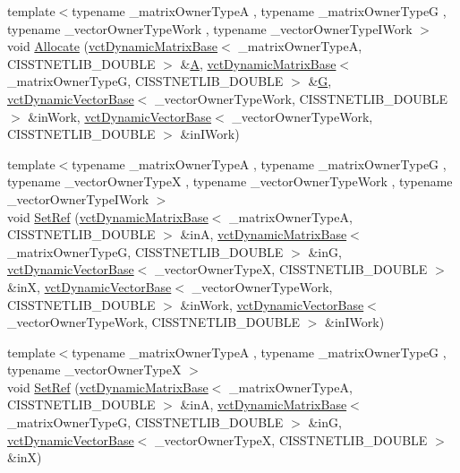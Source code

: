 \begin{DoxyCompactItemize}
{\footnotesize template$<$typename \-\_\-matrix\-Owner\-Type\-A , typename \-\_\-matrix\-Owner\-Type\-G , typename \-\_\-vector\-Owner\-Type\-Work , typename \-\_\-vector\-Owner\-Type\-I\-Work $>$ }\\void \hyperlink{classnmr_l_sq_lin_solution_dynamic_a292665b5ef73075f7679ebc890e7b09d}{Allocate} (\hyperlink{classvct_dynamic_matrix_base}{vct\-Dynamic\-Matrix\-Base}$<$ \-\_\-matrix\-Owner\-Type\-A, C\-I\-S\-S\-T\-N\-E\-T\-L\-I\-B\-\_\-\-D\-O\-U\-B\-L\-E $>$ \&\hyperlink{classnmr_l_sq_lin_solution_dynamic_aa4a41abac141e2e55dd5cafb59169dfd}{A}, \hyperlink{classvct_dynamic_matrix_base}{vct\-Dynamic\-Matrix\-Base}$<$ \-\_\-matrix\-Owner\-Type\-G, C\-I\-S\-S\-T\-N\-E\-T\-L\-I\-B\-\_\-\-D\-O\-U\-B\-L\-E $>$ \&\hyperlink{classnmr_l_sq_lin_solution_dynamic_a399cb314fb848d36f58c14830bad0c28}{G}, \hyperlink{classvct_dynamic_vector_base}{vct\-Dynamic\-Vector\-Base}$<$ \-\_\-vector\-Owner\-Type\-Work, C\-I\-S\-S\-T\-N\-E\-T\-L\-I\-B\-\_\-\-D\-O\-U\-B\-L\-E $>$ \&in\-Work, \hyperlink{classvct_dynamic_vector_base}{vct\-Dynamic\-Vector\-Base}$<$ \-\_\-vector\-Owner\-Type\-Work, C\-I\-S\-S\-T\-N\-E\-T\-L\-I\-B\-\_\-\-D\-O\-U\-B\-L\-E $>$ \&in\-I\-Work)
\item 
{\footnotesize template$<$typename \-\_\-matrix\-Owner\-Type\-A , typename \-\_\-matrix\-Owner\-Type\-G , typename \-\_\-vector\-Owner\-Type\-X , typename \-\_\-vector\-Owner\-Type\-Work , typename \-\_\-vector\-Owner\-Type\-I\-Work $>$ }\\void \hyperlink{classnmr_l_sq_lin_solution_dynamic_aa5a0eaab043339d1aa2fdaebbffd8cfa}{Set\-Ref} (\hyperlink{classvct_dynamic_matrix_base}{vct\-Dynamic\-Matrix\-Base}$<$ \-\_\-matrix\-Owner\-Type\-A, C\-I\-S\-S\-T\-N\-E\-T\-L\-I\-B\-\_\-\-D\-O\-U\-B\-L\-E $>$ \&in\-A, \hyperlink{classvct_dynamic_matrix_base}{vct\-Dynamic\-Matrix\-Base}$<$ \-\_\-matrix\-Owner\-Type\-G, C\-I\-S\-S\-T\-N\-E\-T\-L\-I\-B\-\_\-\-D\-O\-U\-B\-L\-E $>$ \&in\-G, \hyperlink{classvct_dynamic_vector_base}{vct\-Dynamic\-Vector\-Base}$<$ \-\_\-vector\-Owner\-Type\-X, C\-I\-S\-S\-T\-N\-E\-T\-L\-I\-B\-\_\-\-D\-O\-U\-B\-L\-E $>$ \&in\-X, \hyperlink{classvct_dynamic_vector_base}{vct\-Dynamic\-Vector\-Base}$<$ \-\_\-vector\-Owner\-Type\-Work, C\-I\-S\-S\-T\-N\-E\-T\-L\-I\-B\-\_\-\-D\-O\-U\-B\-L\-E $>$ \&in\-Work, \hyperlink{classvct_dynamic_vector_base}{vct\-Dynamic\-Vector\-Base}$<$ \-\_\-vector\-Owner\-Type\-Work, C\-I\-S\-S\-T\-N\-E\-T\-L\-I\-B\-\_\-\-D\-O\-U\-B\-L\-E $>$ \&in\-I\-Work)
\item 
{\footnotesize template$<$typename \-\_\-matrix\-Owner\-Type\-A , typename \-\_\-matrix\-Owner\-Type\-G , typename \-\_\-vector\-Owner\-Type\-X $>$ }\\void \hyperlink{classnmr_l_sq_lin_solution_dynamic_a1d7e2bc11a4fa74c799179eaf713d907}{Set\-Ref} (\hyperlink{classvct_dynamic_matrix_base}{vct\-Dynamic\-Matrix\-Base}$<$ \-\_\-matrix\-Owner\-Type\-A, C\-I\-S\-S\-T\-N\-E\-T\-L\-I\-B\-\_\-\-D\-O\-U\-B\-L\-E $>$ \&in\-A, \hyperlink{classvct_dynamic_matrix_base}{vct\-Dynamic\-Matrix\-Base}$<$ \-\_\-matrix\-Owner\-Type\-G, C\-I\-S\-S\-T\-N\-E\-T\-L\-I\-B\-\_\-\-D\-O\-U\-B\-L\-E $>$ \&in\-G, \hyperlink{classvct_dynamic_vector_base}{vct\-Dynamic\-Vector\-Base}$<$ \-\_\-vector\-Owner\-Type\-X, C\-I\-S\-S\-T\-N\-E\-T\-L\-I\-B\-\_\-\-D\-O\-U\-B\-L\-E $>$ \&in\-X)

\end{DoxyCompactItemize}
